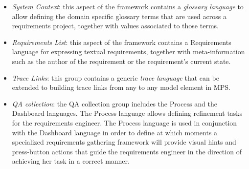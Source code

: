 \begin{itemize}
  \item \emph{System Context}: this aspect of the framework contains a
  \emph{glossary language} to allow defining the domain specific glossary terms that are used across a
  requirements project, together with values associated to those
  terms.
  \item \emph{Requirements List}: this aspect of the framework contains a
  \textsf{Requirements} language for expressing textual requirements, together with meta-information
  such as the author of the requirement or the requirement's current state.
  \item \emph{Trace Links}: this group contains a generic \emph{trace
  language} that can be extended to building trace links from any to any model
  element in MPS.
  \item \emph{QA collection}: the QA collection group includes the
  \textsf{Process} and the \textsf{Dashboard} languages. The \textsf{Process}
  language allows defining refinement tasks for the requirements engineer.
  The \textsf{Process} language is used in conjunction with the
  \textsf{Dashboard} language in order to define at which moments a specialized requirements
  gathering framework will provide visual hints and press-button actions that
  guide the requirements engineer in the direction of achieving her task in a
  correct manner.

\end{itemize}
\vspace{-.7cm}

